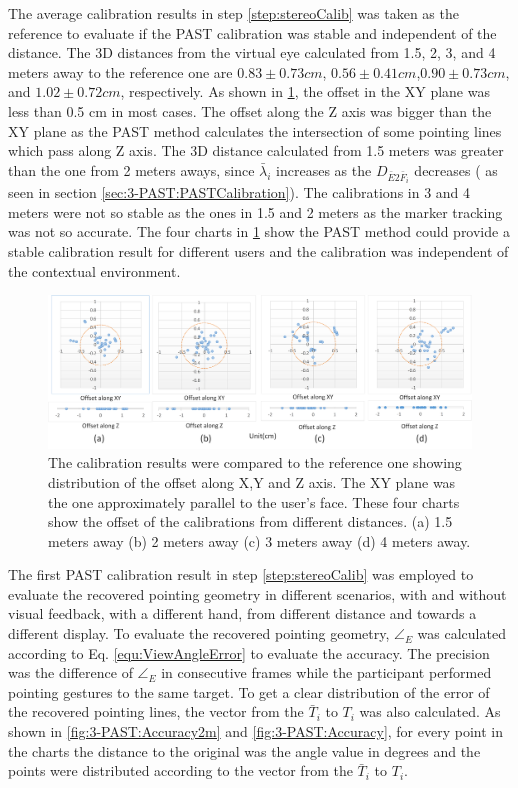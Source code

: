 The average calibration results in step \ref{step:stereoCalib} was taken as the reference to evaluate if the PAST calibration was stable and independent of the distance. The 3D distances from the virtual eye calculated from 1.5, 2, 3, and 4 meters away to the reference one are $0.83\pm0.73cm$, $0.56\pm0.41cm$,$0.90\pm0.73cm$, and $1.02\pm0.72cm$, respectively. 
As shown in \figurename{ \ref{fig:3-PAST:PAST}}, the offset in the XY plane was less than 0.5 cm in most cases. The offset along the Z axis was bigger than the XY plane as the PAST method calculates the intersection of some pointing lines which pass along Z axis. 
The 3D distance calculated from 1.5 meters was greater than the one from 2 meters aways, since $\bar\lambda_i$ increases as the $ D_{\bar E2 \bar F_i}$ decreases ( as seen in section \ref{sec:3-PAST:PASTCalibration}).  
The calibrations in 3 and 4 meters were not so stable as the ones in 1.5 and 2 meters as the marker tracking was not so accurate. The four charts in \figurename{ \ref{fig:3-PAST:PAST}} show the PAST method could provide a stable calibration result for different users and the calibration was independent of the contextual environment. 

\begin{figure}[htb]
	\centering
	\includegraphics[width=\linewidth]{figures/3-PAST/PAST.png}
	\caption{The calibration results were compared to the reference one showing distribution of the offset along X,Y and Z axis. The XY plane was the one approximately parallel to the user's face. These four charts show the offset of the calibrations from different distances. (a) 1.5 meters away (b) 2 meters away (c) 3 meters away (d) 4 meters away.}
	\label{fig:3-PAST:PAST}
\end{figure}
The first PAST calibration result in step \ref{step:stereoCalib} was employed to evaluate the recovered pointing geometry in different scenarios, with and without visual feedback, with a different hand, from different distance and towards a different display. To evaluate the recovered pointing geometry, ${\angle}_{E}$ was calculated according to Eq. \ref{equ:ViewAngleError} to evaluate the accuracy. The precision was the difference of ${\angle}_{E}$ in consecutive frames while the participant performed pointing gestures to the same target. To get a clear distribution of the error of the recovered pointing lines, the vector from the $\bar T_i$ to $T_i$ was also calculated. As shown in \figurename{ \ref{fig:3-PAST:Accuracy2m}} and \figurename{ \ref{fig:3-PAST:Accuracy}}, for every point in the charts the distance to the original was the angle value in degrees and the points were distributed according to the vector from the $\bar T_i$ to $T_i$.

